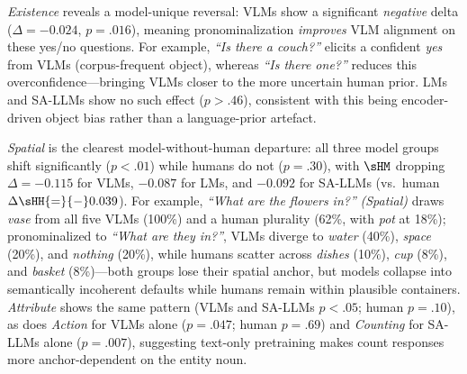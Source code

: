 \textit{Existence} reveals a model-unique reversal: VLMs show a significant \emph{negative} delta ($\Delta{=}{-}0.024$, $p{=}.016$), meaning pronominalization \emph{improves} VLM alignment on these yes/no questions.
For example, \textit{``Is there a couch?''} elicits a confident \textit{yes} from VLMs (corpus-frequent object), whereas \textit{``Is there one?''} reduces this overconfidence---bringing VLMs closer to the more uncertain human prior.
LMs and SA-LLMs show no such effect ($p{>}.46$), consistent with this being encoder-driven object bias rather than a language-prior artefact.

\textit{Spatial} is the clearest model-without-human departure: all three model groups shift significantly ($p{<}.01$) while humans do not ($p{=}.30$), with $\sHM$ dropping $\Delta{=}{-}0.115$ for VLMs, ${-}0.087$ for LMs, and ${-}0.092$ for SA-LLMs (vs.\ human $\Delta\sHH{=}{-}0.039$).
For example, \textit{``What are the flowers in?''} \emph{(Spatial)} draws \textit{vase} from all five VLMs (100\%) and a human plurality (62\%, with \textit{pot} at 18\%); pronominalized to \textit{``What are they in?''}, VLMs diverge to \textit{water} (40\%), \textit{space} (20\%), and \textit{nothing} (20\%), while humans scatter across \textit{dishes} (10\%), \textit{cup} (8\%), and \textit{basket} (8\%)---both groups lose their spatial anchor, but models collapse into semantically incoherent defaults while humans remain within plausible containers.
\textit{Attribute} shows the same pattern (VLMs and SA-LLMs $p{<}.05$; human $p{=}.10$), as does \textit{Action} for VLMs alone ($p{=}.047$; human $p{=}.69$) and \textit{Counting} for SA-LLMs alone ($p{=}.007$), suggesting text-only pretraining makes count responses more anchor-dependent on the entity noun.
